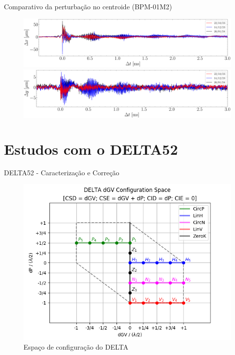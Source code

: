 \documentclass{beamer}					  %
\begin{document}
\begin{frame}{Comparativo da perturbação no centroide (BPM-01M2)}
    \begin{figure}[H]
        	\centering
            \includegraphics[width=1.0\textwidth]{2024-01-26/figures/injection_perturbation_compare_x_2024.pdf}
            \includegraphics[width=1.0\textwidth]{2024-01-26/figures/injection_perturbation_compare_y_2024.pdf}
    \end{figure} 
\end{frame}

\section{Estudos com o DELTA52}

\begin{frame}{DELTA52 - Caracterização e Correção}
    \begin{figure}[H]
    		\centering
            \includegraphics[width=.8\textwidth]{2024-01-26/figures/id-delta-dgv-config-space.png}
            \caption{Espaço de configuração do DELTA}
            \label{fig:delta-config-space}
    \end{figure}
\end{frame}
\end{document}
